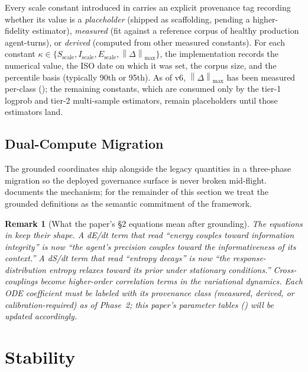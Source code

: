 \documentclass[11pt,twocolumn]{article}
\newtheorem{remark}[theorem]{Remark}
\newcommand{\norm}[1]{\left\lVert #1 \right\rVert}
\begin{document}
Every scale constant introduced in
carries an explicit provenance tag recording whether its value is
a \emph{placeholder} (shipped as scaffolding, pending a
higher-fidelity estimator), \emph{measured} (fit against a
reference corpus of healthy production agent-turns), or
\emph{derived} (computed from other measured constants). For
each constant $\kappa \in \{S_{\text{scale}}, I_{\text{scale}},
E_{\text{scale}}, \norm{\Delta}_{\max}\}$, the implementation
records the numerical value, the ISO date on which it was set,
the corpus size, and the percentile basis (typically 90th or
95th). As of v6, $\norm{\Delta}_{\max}$ has been measured
per-class (); the remaining
constants, which are consumed only by the tier-1 logprob and
tier-2 multi-sample estimators, remain placeholders until those
estimators land.

\subsection{Dual-Compute Migration}

The grounded coordinates ship alongside the legacy quantities in
a three-phase migration so the deployed governance surface is
never broken mid-flight.  documents the
mechanism; for the remainder of this section we treat the
grounded definitions as the semantic commitment of the framework.

\begin{remark}[What the paper's §2 equations mean after grounding]
The equations in  keep their shape. A
dE/dt term that read ``energy couples toward information
integrity'' is now ``the agent's precision couples toward the
informativeness of its context.'' A dS/dt term that read ``entropy
decays'' is now ``the response-distribution entropy relaxes toward
its prior under stationary conditions.'' Cross-couplings become
higher-order correlation terms in the variational dynamics. Each
ODE coefficient must be labeled with its provenance class
(measured, derived, or calibration-required) as of Phase~2; this
paper's parameter tables () will be
updated accordingly.
\end{remark}


\section{Stability}
\label{sec:contraction}
\end{document}
